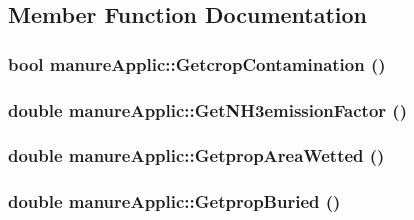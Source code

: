 \subsection{Member Function Documentation}
\hypertarget{classmanure_applic_a3581fc50d2f70fd92023235c2788b435}{
\subsubsection[{GetcropContamination}]{\setlength{\rightskip}{0pt plus 5cm}bool manureApplic::GetcropContamination ()}}
\label{classmanure_applic_a3581fc50d2f70fd92023235c2788b435}
\hypertarget{classmanure_applic_ac1ac216735eb3955d4124e48d8d1c78f}{
\subsubsection[{GetNH3emissionFactor}]{\setlength{\rightskip}{0pt plus 5cm}double manureApplic::GetNH3emissionFactor ()}}
\label{classmanure_applic_ac1ac216735eb3955d4124e48d8d1c78f}
\hypertarget{classmanure_applic_a2828314e17f645f81eff461bd4fa0b9f}{
\subsubsection[{GetpropAreaWetted}]{\setlength{\rightskip}{0pt plus 5cm}double manureApplic::GetpropAreaWetted ()}}
\label{classmanure_applic_a2828314e17f645f81eff461bd4fa0b9f}
\hypertarget{classmanure_applic_a389c300ba0029e1ed26a7b4c60e7cc3c}{
\subsubsection[{GetpropBuried}]{\setlength{\rightskip}{0pt plus 5cm}double manureApplic::GetpropBuried ()}}
